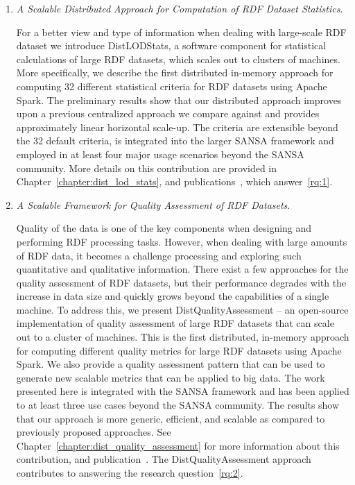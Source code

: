 \begin{enumerate}
    \item \textit{A Scalable Distributed Approach for Computation of \gls{RDF} Dataset Statistics}.
    
    For a better view and type of information when dealing with large-scale \gls{RDF} dataset we introduce DistLODStats, a software component for statistical calculations of large \gls{RDF} datasets, which scales out to clusters of machines.
    More specifically, we describe the first distributed in-memory approach for computing 32 different statistical criteria for \gls{RDF} datasets using Apache Spark.
    The preliminary results show that our distributed approach improves upon a previous centralized approach we compare against and provides approximately linear horizontal scale-up.
    The criteria are extensible beyond the 32 default criteria, is integrated into the larger SANSA framework and employed in at least four major usage scenarios beyond the SANSA community.
    More details on this contribution are provided in Chapter~\ref{chapter:dist_lod_stats}, and publications~\cite{sejdiu-2018-dist-lod-stats-iswc, sejdiu-2018-statisfy-iswc-poster}, which answer~\ref{rq:1}.
    
    \item \textit{A Scalable Framework for Quality Assessment of \gls{RDF} Datasets}.
    
    Quality of the data is one of the key components when designing and performing \gls{RDF} processing tasks.
    However, when dealing with large amounts of \gls{RDF} data, it becomes a challenge processing and exploring such quantitative and qualitative information.
    There exist a few approaches for the quality assessment of \gls{RDF} datasets, but their performance degrades with the increase in data size and quickly grows beyond the capabilities of a single machine. 
    To address this, we present DistQualityAssessment -- an open-source implementation of quality assessment of large \gls{RDF} datasets that can scale out to a cluster of machines.
    This is the first distributed, in-memory approach for computing different quality metrics for large \gls{RDF} datasets using Apache Spark. We also provide a quality assessment pattern that can be used to generate new scalable metrics that can be applied to big data.
    The work presented here is integrated with the SANSA framework and has been applied to at least three use cases beyond the SANSA community.   
    The results show that our approach is more generic, efficient, and scalable as compared to previously proposed approaches.
    See Chapter~\ref{chapter:dist_quality_assessment} for more information about this contribution, and publication~\cite{sejdiu-2019-sansa-dist-quality-assessment-iswc}.
    The DistQualityAssessment approach contributes to answering the research question~\ref{rq:2}.
    

\end{enumerate}
